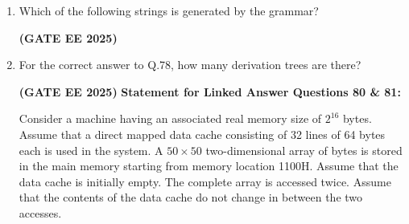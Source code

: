 \documentclass[journal,12pt,onecolumn]{IEEEtran}
\theoremstyle{remark}
\begin{document}
\begin {center}
\begin{enumerate}
\textbf{Statement for Linked Answer Questions 78 \& 79:}  

Consider the CFG with $\{S, A, B\}$ as the non-terminal alphabet, $\{a, b\}$ as the terminal alphabet, $S$ as the start symbol and the following set of production rules:
\[
\begin{aligned}
S &\to aB \quad &S &\to bA \\
B &\to bB \quad &A &\to a \\
B &\to bS \quad &A &\to aS \\
B &\to aBB \quad &A &\to bAA
\end{aligned}
\]




    
    \item Which of the following strings is generated by the grammar?
    \begin{enumerate}
    \end{enumerate}
\hfill \textbf{(GATE EE 2025)}
    \item For the correct answer to Q.78, how many derivation trees are there?
    \begin{enumerate}
    \end{enumerate}

\hfill \textbf{(GATE EE 2025)}
\newline
\textbf{Statement for Linked Answer Questions 80 \& 81:}  

Consider a machine having an associated real memory size of $2^{16}$ bytes. Assume that a direct mapped data cache consisting of 32 lines of 64 bytes each is used in the system. A $50 \times 50$ two-dimensional array of bytes is stored in the main memory starting from memory location 1100H. Assume that the data cache is initially empty. The complete array is accessed twice. Assume that the contents of the data cache do not change in between the two accesses.



\end{enumerate}
\end{center}
\end{document}
